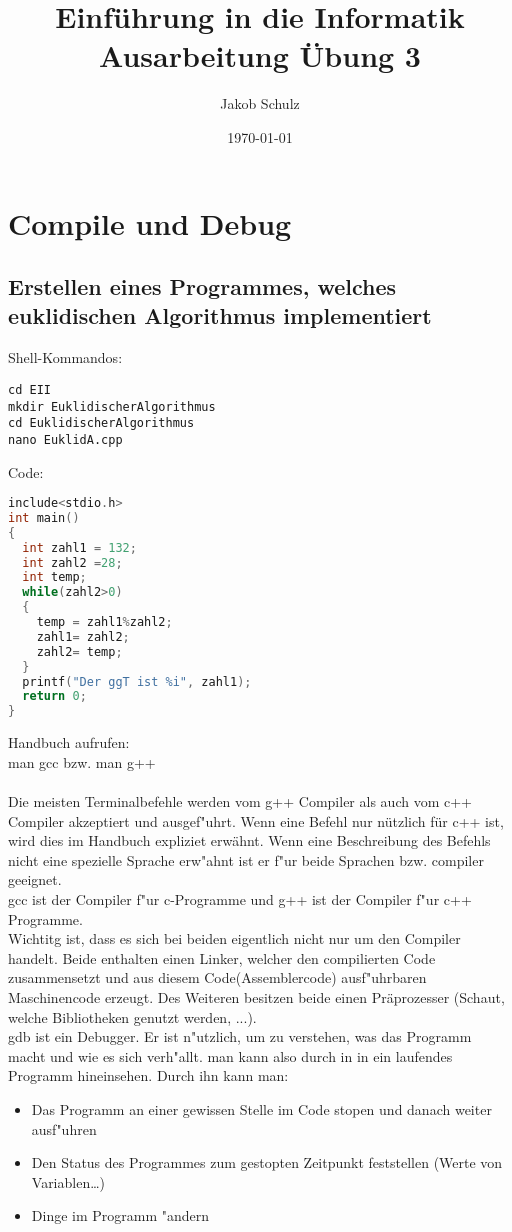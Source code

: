 \documentclass[a4paper,11pt,titlepage]{article}
\begin{document}
\title{Einf\"uhrung in die Informatik\\
Ausarbeitung \"Ubung 3}


\author{Jakob Schulz}


\date{\today}

\maketitle{\thispagestyle{plain}}

\section{Compile und Debug}

\subsection{Erstellen eines Programmes, welches euklidischen Algorithmus implementiert}
Shell-Kommandos:
\begin{verbatim}
cd EII
mkdir EuklidischerAlgorithmus
cd EuklidischerAlgorithmus
nano EuklidA.cpp
\end{verbatim}
Code:
\begin{lstlisting}[language=c++]
include<stdio.h>
int main()
{
  int zahl1 = 132;
  int zahl2 =28; 
  int temp;
  while(zahl2>0) 
  {
    temp = zahl1%zahl2; 
    zahl1= zahl2;
    zahl2= temp;
  }
  printf("Der ggT ist %i", zahl1);
  return 0;
}
\end{lstlisting}
Handbuch aufrufen:\\
man gcc bzw. man g++\\
\\
Die meisten Terminalbefehle werden vom g++ Compiler als auch vom c++ Compiler akzeptiert und ausgef"uhrt. Wenn eine Befehl nur nützlich für c++ ist, wird dies im Handbuch expliziet erwähnt. Wenn eine Beschreibung des Befehls nicht eine spezielle Sprache erw"ahnt ist er f"ur beide Sprachen bzw. compiler geeignet.\\
gcc ist der Compiler f"ur c-Programme und g++ ist der Compiler f"ur c++ Programme.\\
Wichtitg ist, dass es sich bei beiden eigentlich nicht nur um den Compiler handelt. Beide enthalten einen Linker, welcher den compilierten Code zusammensetzt und aus diesem Code(Assemblercode) ausf"uhrbaren Maschinencode erzeugt. Des Weiteren besitzen beide einen Präprozesser (Schaut, welche Bibliotheken genutzt werden, ...). \\
gdb ist ein Debugger. Er ist n"utzlich, um zu verstehen, was das Programm macht und wie es sich verh"allt. man kann also durch in in ein laufendes Programm hineinsehen.
\newpage
Durch ihn kann man:
\begin{itemize}
\item Das Programm an einer gewissen Stelle im Code stopen und danach weiter ausf"uhren
\item Den Status des Programmes zum gestopten Zeitpunkt feststellen (Werte von Variablen\dots)
\item Dinge im Programm "andern
\end{itemize}
\end{document}
